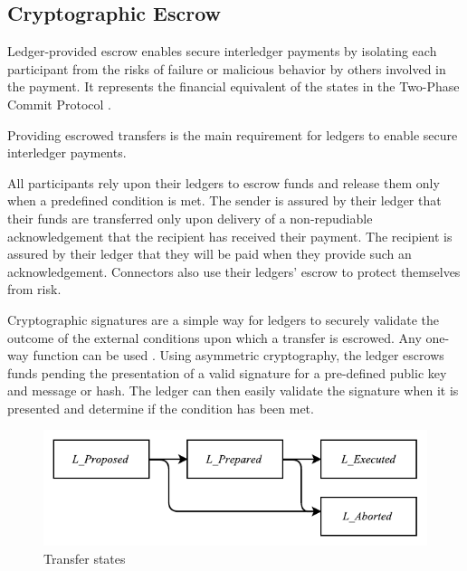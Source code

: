 \documentclass[letterpaper,twocolumn,10pt]{article}
\begin{document}
\subsection{Cryptographic Escrow}




Ledger-provided escrow enables secure interledger payments by isolating each participant from the risks of failure or malicious behavior by others involved in the payment. It represents the financial equivalent of the states in the Two-Phase Commit Protocol \cite{Gray:1978:NDB:647433.723863,gray2006consensus}.

Providing escrowed transfers is the main requirement for ledgers to enable secure interledger payments.

All participants rely upon their ledgers to escrow funds and release them only when a predefined condition is met. The sender is assured by their ledger that their funds are transferred only upon delivery of a non-repudiable acknowledgement that the recipient has received their payment. The recipient is assured by their ledger that they will be paid when they provide such an acknowledgement. Connectors also use their ledgers' escrow to protect themselves from risk.

Cryptographic signatures are a simple way for ledgers to securely validate the outcome of the external conditions upon which a transfer is escrowed. Any one-way function can be used \cite{rompel1990one}. Using asymmetric cryptography, the ledger escrows funds pending the presentation of a valid signature for a pre-defined public key and message or hash. The ledger can then easily validate the signature when it is presented and determine if the condition has been met.

\begin{figure}[ht]
    \centering
    \includegraphics[width=\columnwidth]{figures/transfer-states.pdf}
    \caption{Transfer states}
    \label{fig:transfer-states}
\end{figure}
\end{document}
